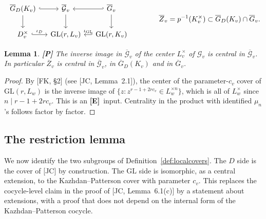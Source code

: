 \documentclass[12pt]{article}
\newcommand{\ov}[1]{\overline{#1}}
\newcommand{\GL}{\mathrm{GL}}
\newcommand{\Gb}{\ov{G}}
\newcommand{\Zb}{\ov{Z}}
\newcommand{\GDb}{\ov{G}_D}
\newcommand{\cG}{\mathcal{G}}
\newcommand{\cGb}{\ov{\mathcal{G}}}
\newcommand{\iD}{\iota_D}
\newcommand{\iG}{\iota_{\GL}}
\newcommand{\Pv}{\textbf{[P]}}
\newcommand{\Ev}{\textbf{[E]}}
\theoremstyle{plain}
\newtheorem{lemma}[theorem]{Lemma}
\theoremstyle{definition}
\begin{document}
\begin{equation}\label{eq:diagram}
\begin{tikzcd}[column sep=small]
\GDb(K_v)\arrow[r,hook]\arrow[d] & \cGb_v\arrow[d] & \Gb_v\arrow[l,hook']\arrow[d]\\
D_v^\times\arrow[r,hook,"\iD"] & \GL(r,L_v) & \GL(r,K_v)\arrow[l,hook',"\iG"']
\end{tikzcd}
\qquad\qquad \Zb_v=p^{-1}(K_v^\times)\subset\GDb(K_v)\cap\Gb_v.
\end{equation}

\begin{lemma}\label{lem:center}\Pv
The inverse image in $\cGb_v$ of the center $L_v^\times$ of $\cG_v$ is central in $\cGb_v$. In particular $\Zb_v$ is central in $\cGb_v$, in $\GDb(K_v)$ and in $\Gb_v$.
\end{lemma}
\begin{proof}
By [FK, \S2] (see [JC, Lemma~2.1]), the center of the parameter-$c_v$ cover of $\GL(r,L_w)$ is the inverse image of $\{z:z^{r-1+2rc_v}\in L_w^{\times n}\}$, which is all of $L_w^\times$ since $n\mid r-1+2rc_v$. This is an \Ev\ input. Centrality in the product with identified $\mu_n$'s follows factor by factor.
\end{proof}

\subsection{The restriction lemma}\label{subsec:restriction}
We now identify the two subgroups of Definition~\ref{def:localcovers}. The $D$ side is the cover of [JC] by construction. The $\GL$ side is isomorphic, as a central extension, to the Kazhdan--Patterson cover with parameter $c_v$. This replaces the cocycle-level claim in the proof of [JC, Lemma~6.1(c)] by a statement about extensions, with a proof that does not depend on the internal form of the Kazhdan--Patterson cocycle.
\end{document}

